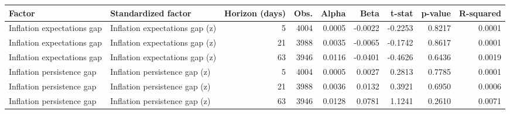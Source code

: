 \begin{tabular}{llrrrrrrr}
\toprule
Factor & Standardized factor & Horizon (days) & Obs. & Alpha & Beta & t-stat & p-value & R-squared \\
\midrule
Inflation expectations gap & Inflation expectations gap (z) & 5 & 4004 & 0.0005 & -0.0022 & -0.2253 & 0.8217 & 0.0001 \\
Inflation expectations gap & Inflation expectations gap (z) & 21 & 3988 & 0.0035 & -0.0065 & -0.1742 & 0.8617 & 0.0001 \\
Inflation expectations gap & Inflation expectations gap (z) & 63 & 3946 & 0.0116 & -0.0401 & -0.4626 & 0.6436 & 0.0019 \\
Inflation persistence gap & Inflation persistence gap (z) & 5 & 4004 & 0.0005 & 0.0027 & 0.2813 & 0.7785 & 0.0001 \\
Inflation persistence gap & Inflation persistence gap (z) & 21 & 3988 & 0.0036 & 0.0132 & 0.3921 & 0.6950 & 0.0006 \\
Inflation persistence gap & Inflation persistence gap (z) & 63 & 3946 & 0.0128 & 0.0781 & 1.1241 & 0.2610 & 0.0071 \\
\bottomrule
\end{tabular}
